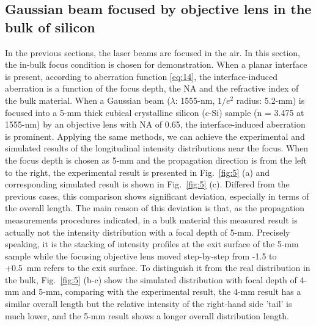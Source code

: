 \documentclass[9pt,twocolumn,twoside]{osajnl}
\begin{document}
\subsection{Gaussian beam focused by objective lens in the bulk of silicon}
In the previous sections, the laser beams are focused in the air. In this section, the in-bulk focus condition is chosen for demonstration. When a planar interface is present, according to aberration function \eqref{eq:14}, the interface-induced aberration is a function of the focus depth, the NA and the refractive index of the bulk material. When a Gaussian beam ($\lambda$: 1555-nm, $1/e^2$ radius: 5.2-mm) is focused into a 5-mm thick cubical crystalline silicon (c-Si) sample (n = 3.475 at 1555-nm) by an objective lens with NA of 0.65, the interface-induced aberration is prominent. Applying the same methods, we can achieve the experimental and simulated results of the longitudinal intensity distributions near the focus. When the focus depth is chosen as 5-mm and the propagation direction is from the left to the right, the experimental result is presented in Fig.~\ref{fig:5} (a) and corresponding simulated result is shown in Fig.~\ref{fig:5} (c). Differed from the previous cases, this comparison shows significant deviation, especially in terms of the overall length. The main reason of this deviation is that, as the propagation measurements procedures indicated, in a bulk material this measured result is actually not the intensity distribution with a focal depth of 5-mm. Precisely speaking, it is the stacking of intensity profiles at the exit surface of the 5-mm sample while the focusing objective lens moved step-by-step from -1.5 to +0.5~mm refers to the exit surface. To distinguish it from the real distribution in the bulk, Fig.~\ref{fig:5} (b-c) show the simulated distribution with focal depth of 4-mm and 5-mm, comparing with the experimental result, the 4-mm result has a similar overall length but the relative intensity of the right-hand side 'tail' is much lower, and the 5-mm result shows a longer overall distribution length.
\end{document}

